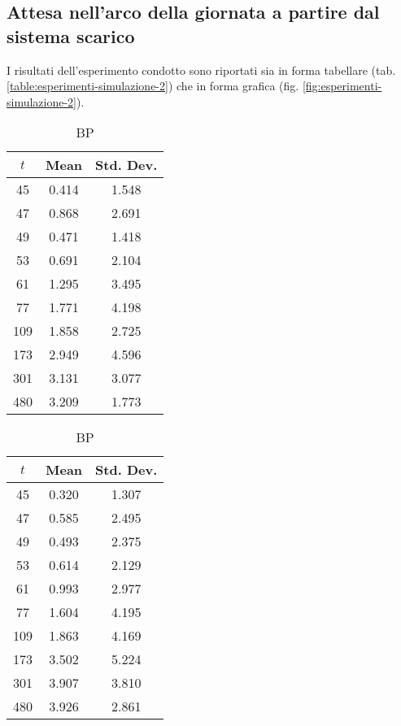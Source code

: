 \subsection*{Attesa nell'arco della giornata a partire dal sistema scarico}
I risultati dell'esperimento condotto sono riportati sia in forma tabellare (tab. \ref{table:esperimenti-simulazione-2}) che in forma grafica (fig. \ref{fig:esperimenti-simulazione-2}).

\begin{table}[ht]
\centering
\begin{subtable}{0.33\textwidth}
\centering
{\tablecolors
\begin{tabular}{|c|c|c|}
\hline
$t$ & Mean & Std. Dev. \\
\hline
45 & 0.414 & 1.548 \\
\hline
47 & 0.868 & 2.691 \\
\hline
49 & 0.471 & 1.418 \\
\hline
53 & 0.691 & 2.104 \\
\hline
61 & 1.295 & 3.495 \\
\hline
77 & 1.771 & 4.198 \\
\hline
109 & 1.858 & 2.725 \\
\hline
173 & 2.949 & 4.596 \\
\hline
301 & 3.131 & 3.077 \\
\hline
480 & 3.209 & 1.773 \\
\hline
\end{tabular}}
\caption{\uo{} BP}
\end{subtable}%
\begin{subtable}{0.33\textwidth}
\centering
{\tablecolors
\begin{tabular}{|c|c|c|}
\hline
$t$ & Mean & Std. Dev. \\
\hline
45 & 0.320 & 1.307 \\
\hline
47 & 0.585 & 2.495 \\
\hline
49 & 0.493 & 2.375 \\
\hline
53 & 0.614 & 2.129 \\
\hline
61 & 0.993 & 2.977 \\
\hline
77 & 1.604 & 4.195 \\
\hline
109 & 1.863 & 4.169 \\
\hline
173 & 3.502 & 5.224 \\
\hline
301 & 3.907 & 3.810 \\
\hline
480 & 3.926 & 2.861 \\
\hline
\end{tabular}}
\caption{\pp{} BP}

\end{subtable}
\end{table}
